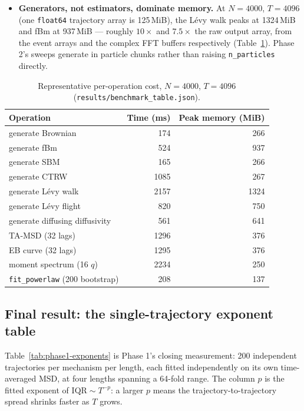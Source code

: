 \documentclass[11pt]{article}
\newcommand{\code}[1]{\texttt{#1}}
\begin{document}
\begin{itemize}
  the square of the second moment ($t^{6-2\gamma}$), the relative standard
  error of the ensemble MSD grows roughly as $t^{(\gamma-1)/2}$: measured at
  $\gamma=1.4$, $N=3000$, it runs from $1.9\%$ at $t=10$ to $5.7\%$ at
  $t=4095$. This is an independent reason (on top of the window-count
  argument) to cap the TA-MSD fitting window.
\item \textbf{Generators, not estimators, dominate memory.} At $N{=}4000$,
  $T{=}4096$ (one \code{float64} trajectory array is 125\,MiB), the L\'evy walk
  peaks at 1324\,MiB and fBm at 937\,MiB --- roughly $10\times$ and $7.5\times$
  the raw output array, from the event arrays and the complex FFT buffers
  respectively (Table~\ref{tab:benchmark}). Phase 2's sweeps generate in
  particle chunks rather than raising \code{n\_particles} directly.
\end{itemize}

\begin{table}[htbp]
\centering
\caption{Representative per-operation cost, $N{=}4000$, $T{=}4096$
(\code{results/benchmark\_table.json}).}
\label{tab:benchmark}
\begin{tabular}{lrr}
\toprule
Operation & Time (ms) & Peak memory (MiB) \\
\midrule
generate Brownian & 174 & 266 \\
generate fBm & 524 & 937 \\
generate SBM & 165 & 266 \\
generate CTRW & 1085 & 267 \\
generate L\'evy walk & 2157 & 1324 \\
generate L\'evy flight & 820 & 750 \\
generate diffusing diffusivity & 561 & 641 \\
TA-MSD (32 lags) & 1296 & 376 \\
EB curve (32 lags) & 1295 & 376 \\
moment spectrum (16 $q$) & 2234 & 250 \\
\code{fit\_powerlaw} (200 bootstrap) & 208 & 137 \\
\bottomrule
\end{tabular}
\end{table}

\subsection{Final result: the single-trajectory exponent table}

Table~\ref{tab:phase1-exponents} is Phase 1's closing measurement: 200
independent trajectories per mechanism per length, each fitted independently
on its own time-averaged MSD, at four lengths spanning a 64-fold range. The
column $p$ is the fitted exponent of $\mathrm{IQR}\sim T^{-p}$: a larger $p$
means the trajectory-to-trajectory spread shrinks faster as $T$ grows.
\end{document}
